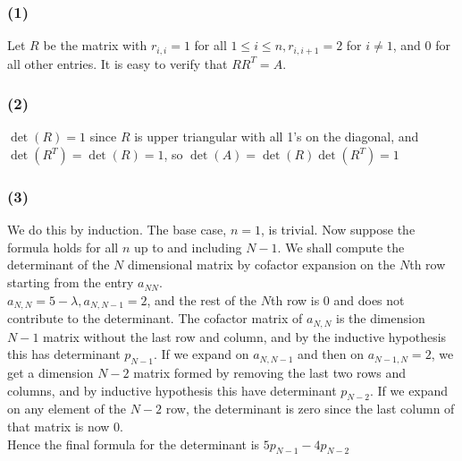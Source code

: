 \documentclass{article}
\begin{document}
\subsubsection{(1)} Let $R$ be the matrix with $r_{i,i}=1$ for all $1\le i\le n, r_{i,i+1}=2$ for $i\neq 1$, and 0 for all other entries. It is easy to verify that $RR^T=A$. 
\subsubsection{(2)} $\det(R)=1$ since $R$ is upper triangular with all 1's on the diagonal, and $\det(R^T)=\det(R)=1$, so $\det(A)=\det(R)\det(R^T)=1$
\subsubsection{(3)} We do this by induction. The base case, $n=1$, is trivial. Now suppose the formula holds for all $n$ up to and including $N-1$. We shall compute the determinant of the $N$ dimensional matrix by cofactor expansion on the $N$th row starting from the entry $a_{NN}$. 
\\$a_{N,N}=5-\lambda,a_{N,N-1}=2$, and the rest of the $N$th row is 0 and does not contribute to the determinant. The cofactor matrix of $a_{N,N}$ is the dimension $N-1$ matrix without the last row and column, and by the inductive hypothesis this has determinant $p_{N-1}$. If we expand on $a_{N,N-1}$ and then on $a_{N-1,N}=2$, we get a dimension $N-2$ matrix formed by removing the last two rows and columns, and by inductive hypothesis this have determinant $p_{N-2}$. If we expand on any element of the $N-2$ row, the determinant is zero since the last column of that matrix is now 0.
\\Hence the final formula for the determinant is $5p_{N-1}-4p_{N-2}$
\end{document}
